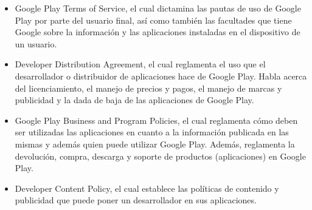 \begin{itemize}
  \item Google Play Terms of Service, el cual dictamina las pautas de uso de Google Play por parte del usuario final, así como también las facultades que tiene Google sobre la información y las aplicaciones instaladas en el dispositivo de un usuario.
  \item Developer Distribution Agreement, el cual reglamenta el uso que el desarrollador o distribuidor de aplicaciones hace de Google Play. Habla acerca del licenciamiento, el manejo de precios y pagos, el manejo de marcas y publicidad y la dada de baja de las aplicaciones de Google Play.
  \item Google Play Business and Program Policies, el cual reglamenta cómo deben ser utilizadas las aplicaciones en cuanto a la información publicada en las mismas y además quien puede utilizar Google Play. Además, reglamenta la devolución, compra, descarga y soporte de productos (aplicaciones) en Google Play.
  \item Developer Content Policy, el cual establece las políticas de contenido y publicidad que puede poner un desarrollador en sus aplicaciones.
\end{itemize}
